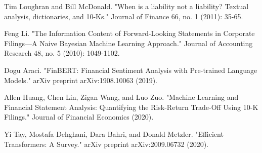 \documentclass[12pt]{article}
\begin{document}
\begin{thebibliography}{}
Tim Loughran and Bill McDonald. "When is a liability not a liability? Textual analysis, dictionaries, and 10-Ks." Journal of Finance 66, no. 1 (2011): 35-65.

Feng Li. "The Information Content of Forward-Looking Statements in Corporate Filings—A Naive Bayesian Machine Learning Approach." Journal of Accounting Research 48, no. 5 (2010): 1049-1102.

Dogu Araci. "FinBERT: Financial Sentiment Analysis with Pre-trained Language Models." arXiv preprint arXiv:1908.10063 (2019).

Allen Huang, Chen Lin, Zigan Wang, and Luo Zuo. "Machine Learning and Financial Statement Analysis: Quantifying the Risk-Return Trade-Off Using 10-K Filings." Journal of Financial Economics (2020).

Yi Tay, Mostafa Dehghani, Dara Bahri, and Donald Metzler. "Efficient Transformers: A Survey." arXiv preprint arXiv:2009.06732 (2020).


\end{thebibliography}
\end{document}
